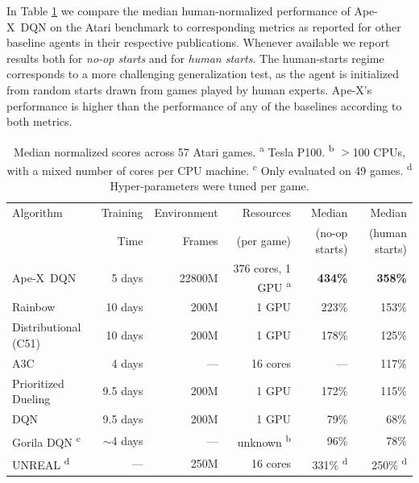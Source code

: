 \documentclass{article} %
\def\apex{Ape-X}
\def\smallcaption#1{\caption{\small #1}\vspace{-0.4cm}}
\begin{document}
In Table \ref{tab:atari_aggregated_scores} we compare the median human-normalized performance of \apex\ DQN on the Atari benchmark to corresponding metrics as reported for other baseline agents in their respective publications. Whenever available we report results both for \emph{no-op starts} and for \emph{human starts}. The human-starts regime \citep{gorila} corresponds to a more challenging generalization test, as the agent is initialized from random starts drawn from games played by human experts. \apex's performance is higher than the performance of any of the baselines according to both metrics.

\begin{table}
\renewcommand\footnoterule{}
\small{
\begin{tabular}{ | l | r r r r r|}
\hline
Algorithm & Training & Environment & Resources  & Median         & Median \\
          & Time     & Frames      & (per game) & (no-op starts) & (human starts) \\
\hline
\apex\ DQN & 5 days & 22800M & 376 cores, 1 GPU \textsuperscript{a} & \textbf{434\%} & \textbf{358\%}\\

Rainbow              & 10 days   & 200M & 1 GPU      & 223\% & 153\% \\ 
Distributional (C51) & 10 days   & 200M & 1 GPU      & 178\% & 125\% \\ 
A3C                  & 4 days    & ---  & 16 cores & --- & 117\% \\ 
Prioritized Dueling  & 9.5 days  & 200M & 1 GPU      & 172\% & 115\% \\ 
DQN                  & 9.5 days  & 200M & 1 GPU      & 79\%  & 68\% \\ 
\hdashline

Gorila DQN \textsuperscript{c} & $\sim$4 days & --- & unknown \textsuperscript{b} & 96\% & 78\% \\
UNREAL \textsuperscript{d} & --- & 250M & 16 cores & 331\% \textsuperscript{d} & 250\% \textsuperscript{d} \\
\hline
\end{tabular}
}
\smallcaption{Median normalized scores across 57 Atari games.
\textsuperscript{a} Tesla P100. \textsuperscript{b} $>$100 CPUs, with a mixed number of cores per CPU machine.
\textsuperscript{c} Only evaluated on 49 games. \textsuperscript{d} Hyper-parameters were tuned per game.}
\label{tab:atari_aggregated_scores}
\end{table}
\end{document}
